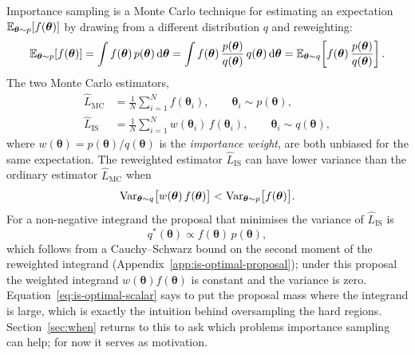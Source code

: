 Importance sampling is a Monte Carlo technique for estimating an
expectation $\mathbb{E}_{\bm{\theta} \sim p}[f(\bm{\theta})]$ by drawing from a
different distribution $q$ and reweighting:
%
\begin{equation}
  \mathbb{E}_{\bm{\theta} \sim p}[f(\bm{\theta})]
  = \int f(\bm{\theta})\, p(\bm{\theta}) \,\mathrm{d}\bm{\theta}
  = \int f(\bm{\theta})\,
      \frac{p(\bm{\theta})}{q(\bm{\theta})}\, q(\bm{\theta}) \,\mathrm{d}\bm{\theta}
  = \mathbb{E}_{\bm{\theta} \sim q}\!\left[
      f(\bm{\theta})\,\frac{p(\bm{\theta})}{q(\bm{\theta})}\right].
  \label{eq:is-basic-identity}
\end{equation}
%
The two Monte Carlo estimators,
%
\begin{align}
  \hat{L}_{\mathrm{MC}} &= \frac{1}{N} \sum_{i=1}^{N} f(\bm{\theta}_i), \qquad \bm{\theta}_i \sim p(\bm{\theta}), \\
  \hat{L}_{\mathrm{IS}} &= \frac{1}{N} \sum_{i=1}^{N} w(\bm{\theta}_i)\, f(\bm{\theta}_i), \qquad \bm{\theta}_i \sim q(\bm{\theta}),
\end{align}
%
where $w(\bm{\theta}) = p(\bm{\theta})/q(\bm{\theta})$ is the
\emph{importance weight}, are both unbiased for the same expectation.
The reweighted estimator $\hat{L}_{\mathrm{IS}}$ can have lower variance
than the ordinary estimator $\hat{L}_{\mathrm{MC}}$ when
%
\begin{equation}
  \operatorname{Var}_{\bm{\theta} \sim q}\!\big[w(\bm{\theta})\,f(\bm{\theta})\big]
  < \operatorname{Var}_{\bm{\theta} \sim p}\!\big[f(\bm{\theta})\big].
\end{equation}
%
For a non-negative integrand the proposal that minimises the variance of
$\hat{L}_{\mathrm{IS}}$ is
%
\begin{equation}
  q^{*}(\bm{\theta}) \propto f(\bm{\theta})\,p(\bm{\theta}),
  \label{eq:is-optimal-scalar}
\end{equation}
%
which follows from a Cauchy--Schwarz bound on the second moment of the
reweighted integrand (Appendix~\ref{app:is-optimal-proposal}); under
this proposal the weighted integrand $w(\bm{\theta})f(\bm{\theta})$ is
constant and the variance is zero. Equation~\eqref{eq:is-optimal-scalar}
says to put the proposal mass where the integrand is large, which is
exactly the intuition behind oversampling the hard regions.
Section~\ref{sec:when} returns to this to ask which problems importance
sampling can help; for now it serves as motivation.


